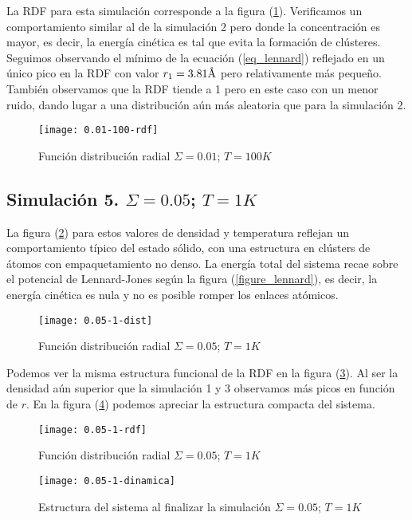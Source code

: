 La RDF para esta simulación corresponde a la figura (\ref{rdf_0.01-100}). Verificamos un comportamiento similar al de la simulación 2 pero donde la concentración es mayor, es decir, la energía cinética es tal que evita la formación de clústeres. Seguimos observando el mínimo de la ecuación (\ref{eq_lennard}) reflejado en un único pico en la RDF con valor $r_{1} = 3.81 \textup{\r{A}}$ pero relativamente más pequeño. También observamos que la RDF tiende a 1 pero en este caso con un menor ruido, dando lugar a una distribución aún más aleatoria que para la simulación 2.

\begin{figure}[t]
	\texttt{[image: 0.01-100-rdf]}
	\caption{Función distribución radial $\Sigma=0.01$; $T=100K$}
	\label{rdf_0.01-100}
\end{figure}

\subsection{Simulación 5. $\Sigma=0.05$; $T=1K$}

La figura (\ref{dist_0.05-1}) para estos valores de densidad y temperatura reflejan un comportamiento típico del estado sólido, con una estructura en clústers de átomos con empaquetamiento no denso. La energía total del sistema recae sobre el potencial de Lennard-Jones según la figura (\ref{figure_lennard}), es decir, la energía cinética es nula y no es posible romper los enlaces atómicos.

\begin{figure}[t]
	\texttt{[image: 0.05-1-dist]}
	\caption{Función distribución radial $\Sigma=0.05$; $T=1K$}
	\label{dist_0.05-1}
\end{figure}

Podemos ver la misma estructura funcional de la RDF en la figura (\ref{rdf_0.05-1}). Al ser la densidad aún superior que la simulación 1 y 3 observamos más picos en función de $r$. En la figura (\ref{dinamica_0.05-1}) podemos apreciar la estructura compacta del sistema.

\begin{figure}[t]
	\texttt{[image: 0.05-1-rdf]}
	\caption{Función distribución radial $\Sigma=0.05$; $T=1K$}
	\label{rdf_0.05-1}
\end{figure}

\begin{figure}[t]
	\texttt{[image: 0.05-1-dinamica]}
	\caption{Estructura del sistema al finalizar la simulación $\Sigma=0.05$; $T=1K$}
	\label{dinamica_0.05-1}
\end{figure}

